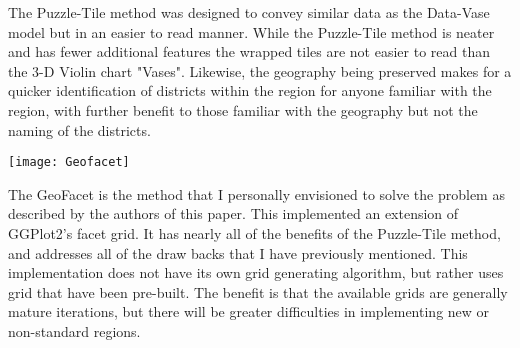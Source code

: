 \documentclass[a4paper,man,natbib]{apa6}
\begin{document}
	The Puzzle-Tile method was designed to convey similar data as the Data-Vase model but in an easier to read manner. While the Puzzle-Tile method is neater and has fewer additional features the wrapped tiles are not easier to read than the 3-D Violin chart "Vases". Likewise, the geography being preserved makes for a quicker identification of districts within the region for anyone familiar with the region, with further benefit to those familiar with the geography but not the naming of the districts. \vspace{2em}
	
	\begin{minipage}{\linewidth}
		\begin{center}
			\texttt{[image: Geofacet]}
		\end{center}
	\end{minipage}\vspace{2em} 
	
	The GeoFacet is the method that I personally envisioned to solve the problem as described by the authors of this paper. This implemented an extension of GGPlot2's facet grid. It has nearly all of the benefits of the Puzzle-Tile method, and addresses all of the draw backs that I have previously mentioned. This implementation does not have its own grid generating algorithm, but rather uses grid that have been pre-built. The benefit is that the available grids are generally mature iterations, but there will be greater difficulties in implementing new or non-standard regions. \\
	
	

	
\end{document}
